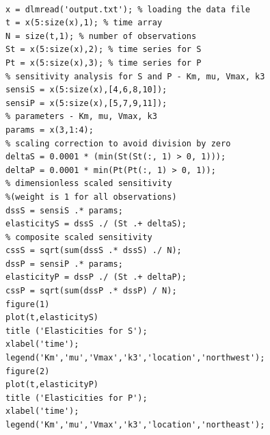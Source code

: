 \newpage

\begin{verbatim}

x = dlmread('output.txt'); % loading the data file
t = x(5:size(x),1); % time array
N = size(t,1); % number of observations
St = x(5:size(x),2); % time series for S
Pt = x(5:size(x),3); % time series for P
% sensitivity analysis for S and P - Km, mu, Vmax, k3 
sensiS = x(5:size(x),[4,6,8,10]); 
sensiP = x(5:size(x),[5,7,9,11]);
% parameters - Km, mu, Vmax, k3
params = x(3,1:4); 
% scaling correction to avoid division by zero
deltaS = 0.0001 * (min(St(St(:, 1) > 0, 1))); 
deltaP = 0.0001 * min(Pt(Pt(:, 1) > 0, 1));
% dimensionless scaled sensitivity 
%(weight is 1 for all observations)
dssS = sensiS .* params; 
elasticityS = dssS ./ (St .+ deltaS); 
% composite scaled sensitivity
cssS = sqrt(sum(dssS .* dssS) ./ N); 
dssP = sensiP .* params;
elasticityP = dssP ./ (St .+ deltaP); 
cssP = sqrt(sum(dssP .* dssP) / N); 
figure(1)
plot(t,elasticityS)
title ('Elasticities for S');
xlabel('time');
legend('Km','mu','Vmax','k3','location','northwest');
figure(2)
plot(t,elasticityP)
title ('Elasticities for P');
xlabel('time');
legend('Km','mu','Vmax','k3','location','northeast');

\end{verbatim}


